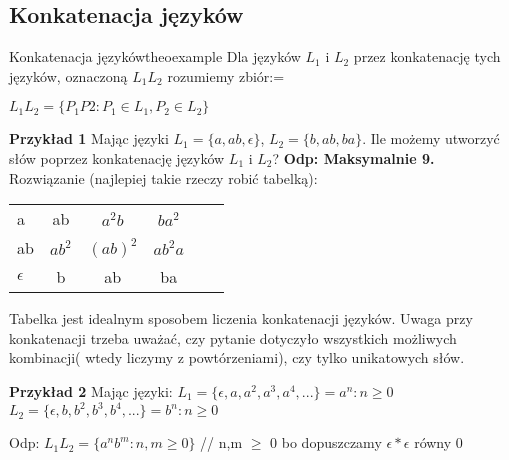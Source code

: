 	
	\subsection{Konkatenacja języków}
		\begin{mytheo}{Konkatenacja języków}{theoexample}
			Dla języków $L_{1}$ i $L_{2}$ przez konkatenację tych języków, 
			oznaczoną $L_{1}L_{2}$ rozumiemy zbiór:=
			\begin{center}
				$L_{1}L_{2} =\{P_{1}P{2}: P_{1} \in L_{1}, P_{2} \in L_{2}\}$
			\end{center}
		\end{mytheo}
		
		
		\begin{tcolorbox}
			\textbf{Przykład 1} \newline
			Mając języki  $L_{1}=\{a, ab, \epsilon \}$, $L_{2}=\{ b,ab, ba \}$.\newline
			Ile możemy utworzyć słów poprzez konkatenację języków $L_{1}$ i $L_{2}$? \newline
			\textbf{Odp: Maksymalnie 9.} \newline
			Rozwiązanie (najlepiej takie rzeczy robić tabelką):\newline
				\begin{tabular}{|l||*{5}{c|}}\hline
					\backslashbox{$L_{1}$}{$L_{2}$}
					&\makebox[3em]{b}&\makebox[3em]{ab}&\makebox[3em]{ba}
					\\\hline\hline
					a  			& ab		& $a^{2}b$		& $ba^{2}$ 		\\\hline
					ab 			& $ab^{2}$ 	& $(ab)^{2}$	& $ab^{2}a$ 	\\\hline
					$\epsilon$ 	& b			& ab			& ba			\\\hline
				\end{tabular}\newline
			Tabelka jest idealnym sposobem liczenia konkatenacji języków. \newline
			{\color{red} Uwaga przy konkatenacji trzeba uważać, czy pytanie dotyczyło 
			wszystkich możliwych kombinacji( wtedy liczymy z powtórzeniami), czy tylko 
			unikatowych słów.} \newline
		\end{tcolorbox}
		
	
		\begin{tcolorbox}
			\textbf{Przykład 2} \newline
			Mając języki: \newline 
				$L_{1}= \{ \epsilon, a, a^{2}, a^{3}, a^{4}, ... \} = {a^{n}: n \ge 0}$ \newline
				$L_{2}= \{ \epsilon, b, b^{2}, b^{3}, b^{4}, ... \} = {b^{n}: n \ge 0}$ \newline
		
			Odp:
				$L_{1}L_{2} = \{ a^{n}b^{m}: n,m \ge 0 \}$	// n,m $\ge$ 0 bo dopuszczamy $		 
				\epsilon * \epsilon$ równy 0
				
		\end{tcolorbox}
		
